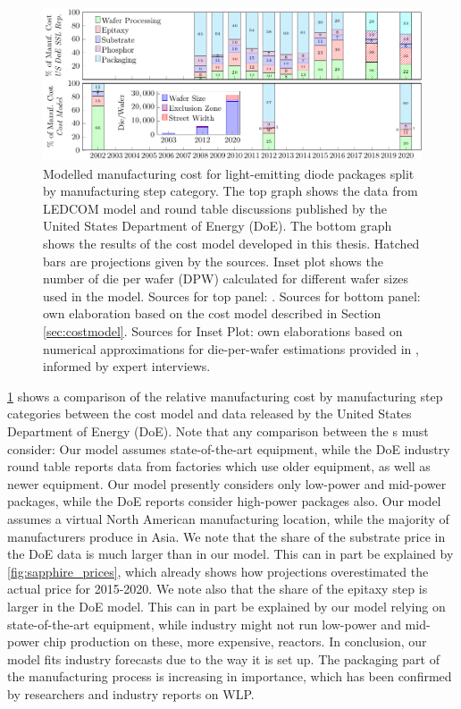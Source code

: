 \documentclass[10pt]{article}
\begin{document}
\begin{figure}[h]
	\centering
    \includegraphics[width=\textwidth]{2_SSL_EES/article/figures/costmodel_calibration.pdf}
	\caption{Modelled manufacturing cost for light-emitting diode packages split by manufacturing step category. The top graph shows the data from LEDCOM model and round table discussions published by the United States Department of Energy (DoE). The bottom graph shows the results of the cost model developed in this thesis. Hatched bars are projections given by the sources. Inset plot shows the number of die per wafer (DPW) calculated for different wafer sizes used in the model. Sources for top panel: \cite{doe2010solid}\cite{doe2011solid}\cite{doe2012solid}\cite{doe2013solid}\cite{doe2014solid}\cite{doe2015solid}\cite{doe2016solid}. Sources for bottom panel: own elaboration based on the cost model described in Section \cref{sec:costmodel}. Sources for Inset Plot: own elaborations based on numerical approximations for die-per-wafer estimations provided in \cite{de2005investigation}, informed by expert interviews.}
	\label{fig:costmodel_calibration}
\end{figure}

\cref{fig:costmodel_calibration} shows a comparison of the relative manufacturing cost by manufacturing step categories between the cost model and data released by the United States Department of Energy (DoE). Note that any comparison between the s must consider: Our model assumes state-of-the-art equipment, while the DoE industry round table reports data from factories which use older equipment, as well as newer equipment. Our model presently considers only low-power and mid-power packages, while the DoE reports consider high-power packages also. Our model assumes a virtual North American manufacturing location, while the majority of manufacturers produce in Asia. We note that the share of the substrate price in the DoE data is much larger than in our model. This can in part be explained by  \cref{fig:sapphire_prices}, which already shows how projections overestimated the actual price for 2015-2020. We note also that the share of the epitaxy step is larger in the DoE model. This can in part be explained by our model relying on state-of-the-art equipment, while industry might not run low-power and mid-power chip production on these, more expensive, reactors. In conclusion, our model fits industry forecasts due to the way it is set up. The packaging part of the manufacturing process is increasing in importance, which has been confirmed by researchers and industry reports on WLP\cite{Lee2011WPL}\cite{Xie2013}\cite{ledsmag2017WLP}.
\end{document}
